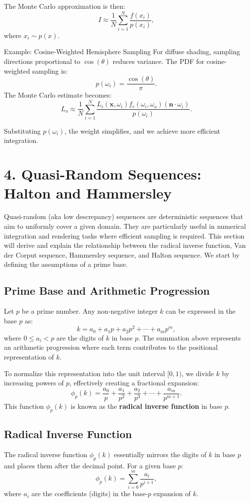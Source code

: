 \documentclass{article}
\begin{document}
The Monte Carlo approximation is then:
\[ I \approx \frac{1}{N} \sum_{i=1}^N \frac{f(x_i)}{p(x_i)}, \]
where \( x_i \sim p(x) \).

Example: Cosine-Weighted Hemisphere Sampling
For diffuse shading, sampling directions proportional to \( \cos(\theta) \) reduces variance. The PDF for cosine-weighted sampling is:
\[ p(\omega_i) = \frac{\cos(\theta)}{\pi}. \]
The Monte Carlo estimate becomes:
\[ L_o \approx \frac{1}{N} \sum_{i=1}^N \frac{L_i(\mathbf{x}, \omega_i) f_r(\omega_i, \omega_o) (\mathbf{n} \cdot \omega_i)}{p(\omega_i)}. \]

Substituting \( p(\omega_i) \), the weight simplifies, and we achieve more efficient integration.

\section*{4. Quasi-Random Sequences: Halton and Hammersley}

Quasi-random (aka low descrepancy) sequences are deterministic sequences that aim to uniformly cover a given domain. They are particularly useful in numerical integration and rendering tasks where efficient sampling is required. This section will derive and explain the relationship between the 
radical inverse function, Van der Corput sequence, Hammersley sequence, and Halton sequence. We start by defining the assumptions of a prime base.

\subsection{Prime Base and Arithmetic Progression}
Let \( p \) be a prime number. Any non-negative integer \( k \) can be expressed in the base \( p \) as:
\[
    k = a_0 + a_1 p + a_2 p^2 + \cdots + a_m p^m,
\]
where \( 0 \leq a_i < p \) are the digits of \( k \) in base \( p \). The summation above represents an arithmetic progression where each term contributes to the positional representation of \( k \).

To normalize this representation into the unit interval \([0, 1)\), we divide \( k \) by increasing powers of \( p \), effectively creating a fractional expansion:
\[
    \phi_p(k) = \frac{a_0}{p} + \frac{a_1}{p^2} + \frac{a_2}{p^3} + \cdots + \frac{a_m}{p^{m+1}}.
\]
This function \( \phi_p(k) \) is known as the \textbf{radical inverse function} in base \( p \).

\subsection{Radical Inverse Function}
The radical inverse function \( \phi_p(k) \) essentially mirrors the digits of \( k \) in base \( p \) and places them after the decimal point. For a given base \( p \):
\[
    \phi_p(k) = \sum_{i=0}^m \frac{a_i}{p^{i+1}},
\]
where \( a_i \) are the coefficients (digits) in the base-\( p \) expansion of \( k \).
\end{document}
